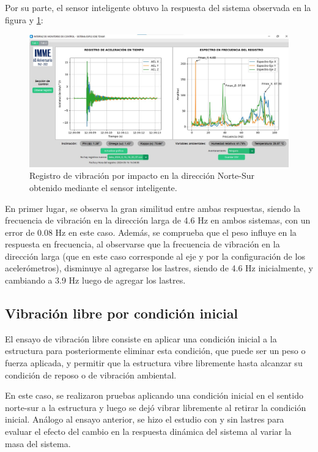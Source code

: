 Por su parte, el sensor inteligente obtuvo la respuesta del sistema observada en la figura y \ref{fig:impactoGUI_NS}:

\begin{figure}[H]
    \centering
    \includegraphics[width = \textwidth]{imagenes/cap3_resultados/Ensayos/VibHammer1NorteSurSMARTSENSOR.jpg}
    \caption{Registro de vibración por impacto en la dirección Norte-Sur obtenido mediante el sensor inteligente.}
    \label{fig:impactoGUI_NS}
\end{figure}

En primer lugar, se observa la gran similitud entre ambas respuestas, siendo la frecuencia de vibración en la dirección larga de 4.6 Hz en ambos sistemas, con un error de 0.08 Hz en este caso. Además, se comprueba que el peso influye en la respuesta en frecuencia, al observarse que la frecuencia de vibración en la dirección larga (que en este caso corresponde al eje y por la configuración de los acelerómetros), disminuye al agregarse los lastres, siendo de 4.6 Hz inicialmente, y cambiando a 3.9 Hz luego de agregar los lastres.

\subsection{Vibración libre por condición inicial}

El ensayo de vibración libre consiste en aplicar una condición inicial a la estructura para posteriormente eliminar esta condición, que puede ser un peso o fuerza aplicada, y permitir que la estructura vibre libremente hasta alcanzar su condición de reposo o de vibración ambiental.

En este caso, se realizaron pruebas aplicando una condición inicial en el sentido norte-sur a la estructura y luego se dejó vibrar libremente al retirar la condición inicial. Análogo al ensayo anterior, se hizo el estudio con y sin lastres para evaluar el efecto del cambio en la respuesta dinámica del sistema al variar la masa del sistema.

